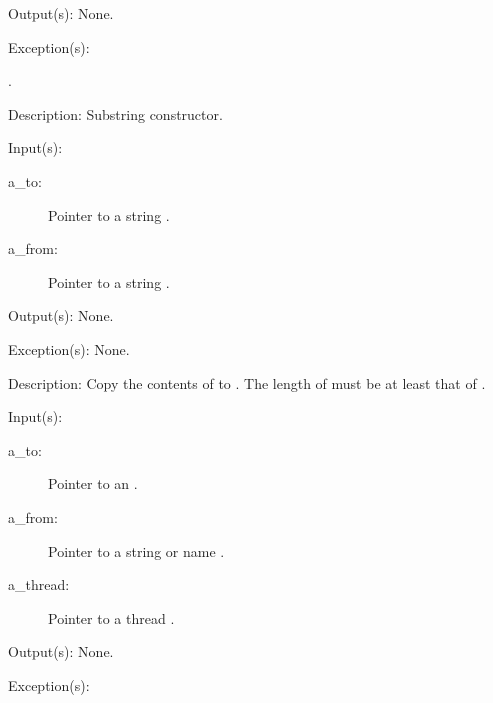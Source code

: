 \begin{capi}
\begin{capilist}
\begin{description}
		\end{description}
	\item[Output(s): ] None.
	\item[Exception(s): ]
		\begin{description}\item[]
		\item[.]
		\end{description}
	\item[Description: ]
		Substring constructor.
	\end{capilist}
\label{nxo_string_copy}
	\begin{capilist}
	\item[Input(s): ]
		\begin{description}\item[]
		\item[a\_to: ]
			Pointer to a string .
		\item[a\_from: ]
			Pointer to a string .
		\end{description}
	\item[Output(s): ] None.
	\item[Exception(s): ] None.
	\item[Description: ]
		Copy the contents of  to .  The length
		of  must be at least that of .
	\end{capilist}
\label{nxo_string_cstring}
	\begin{capilist}
	\item[Input(s): ]
		\begin{description}\item[]
		\item[a\_to: ]
			Pointer to an \classname{nxo}.
		\item[a\_from: ]
			Pointer to a string or name \classname{nxo}.
		\item[a\_thread: ]
			Pointer to a thread \classname{nxo}.
		\end{description}
	\item[Output(s): ] None.
	\item[Exception(s): ]
		\begin{description}\item[]

\end{description}
\end{capilist}
\end{capi}
